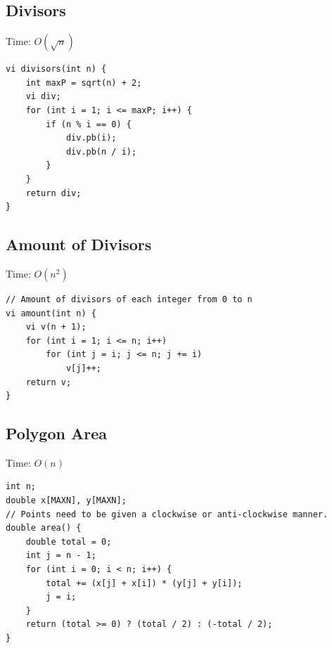 \documentclass[oneside]{article}
\begin{document}
\subsection{Divisors}
Time: $O(\sqrt{n})$
\begin{lstlisting}
vi divisors(int n) {
	int maxP = sqrt(n) + 2;
	vi div;
	for (int i = 1; i <= maxP; i++) {
		if (n % i == 0) {
			div.pb(i);
			div.pb(n / i);
		}
	}
	return div;
}
\end{lstlisting}

\subsection{Amount of Divisors}
Time: $O(n^2)$
\begin{lstlisting}
// Amount of divisors of each integer from 0 to n
vi amount(int n) {
	vi v(n + 1);
	for (int i = 1; i <= n; i++)
		for (int j = i; j <= n; j += i)
			v[j]++;
	return v;
}
\end{lstlisting}

\subsection{Polygon Area}
Time: $O(n)$
\begin{lstlisting}
int n;
double x[MAXN], y[MAXN];
// Points need to be given a clockwise or anti-clockwise manner.
double area() {
    double total = 0;
    int j = n - 1;
    for (int i = 0; i < n; i++) {
        total += (x[j] + x[i]) * (y[j] + y[i]);
        j = i;
    }
    return (total >= 0) ? (total / 2) : (-total / 2);
}
\end{lstlisting}
\end{document}
